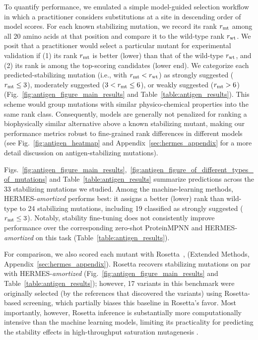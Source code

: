 To quantify performance, we emulated a simple model-guided selection workflow in which a
practitioner considers substitutions at a site in descending order of model scores. For each known
stabilizing mutation, we record its rank $r_{\text{mt}}$ among all 20 amino acids at that position and
compare it to the wild-type rank $r_{\text{wt}}$. We posit that a practitioner would select a particular
mutant for experimental validation if (1) its rank $r_{\text{mt}}$ is better (lower) than that of the
wild-type $r_{\text{wt}}$, and (2) its rank is among the top-scoring candidates (lower end). We categorize
each predicted-stabilizing mutation (i.e., with $r_{\text{mt}} < r_{\text{wt}}$) as strongly suggested ($r_{\text{mt}} \leq
3$), moderately suggested ($3 < r_{\text{mt}} \leq 6$), or weakly suggested ($r_{\text{mt}} > 6$)
(Fig.~\ref{fig:antigen_figure_main_results} {and Table~\ref{table:antigen_results}}). This scheme
would group mutations with similar physico-chemical properties into the same rank class.
Consequently, models are generally not penalized for ranking a biophysically similar alternative
above a known stabilizing mutant, making our performance metrics robust to fine-grained rank
differences in different models (see Fig.~\ref{fig:antigen_heatmap} and Appendix~\ref{sec:hermes_appendix}
for a more detail discussion on antigen-stabilizing mutations).

Figs.~\ref{fig:antigen_figure_main_results},~\ref{fig:antigen_figure_of_different_types_of_mutations}
{and Table~\ref{table:antigen_results}} summarize predictions across the 33 stabilizing mutations we
studied. Among the machine-learning methods, HERMES-\emph{amortized} performs best: it assigns a
better (lower) rank than wild-type to 24 stabilizing mutations, including 19 classified as strongly
suggested ($r_{\text{mt}} \leq 3$). Notably, stability fine-tuning does not consistently improve performance
over the corresponding zero-shot ProteinMPNN and HERMES-{\em amortized} on this task
(Table~\ref{table:antigen_results}).

For comparison, we also scored each mutant with Rosetta~\citep{chaudhury_pyrosetta_2010},
(Extended Methods, Appendix~\ref{sec:hermes_appendix}).
Rosetta recovers stabilizing mutations on par with HERMES-\emph{amortized}
({Fig.~\ref{fig:antigen_figure_main_results} and} Table~\ref{table:antigen_results}); however, 17
variants in this benchmark were originally selected (by the references that discovered the variants)
using Rosetta-based screening, which partially biases this baseline in Rosetta's favor.
Most importantly, however,
Rosetta inference is substantially more computationally intensive than the machine learning models,
limiting its practicality for predicting the stability effects in high-throughput saturation
mutagenesis .

